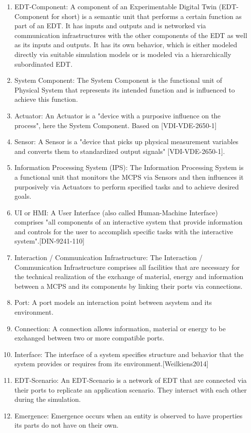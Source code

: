 \begin{enumerate}
\item EDT-Component: A component of an Experimentable Digital Twin (EDT-Component for short) is a semantic unit that performs a certain function as part of an EDT. It has inputs and outputs and is networked via communication infrastructures with the other components of the EDT as well as its inputs and outputs. It has its own behavior, which is either modeled directly via suitable simulation models or is modeled via a hierarchically subordinated EDT.

\item System Component: The System Component is the functional unit of Physical System that represents its intended function and is influenced to achieve this function.

\item Actuator: An Actuator is a "device with a purposive influence on the process", here the System Component. Based on [VDI-VDE-2650-1]

\item Sensor: A Sensor is a "device that picks up physical measurement variables and converts them to standardized output signals" [VDI-VDE-2650-1].

\item Information Processing System (IPS): The Information Processing System is a functional unit that monitors the MCPS via Sensors and then influences it purposively via Actuators to perform specified tasks and to achieve desired goals.

\item UI or HMI: A User Interface (also called Human-Machine Interface) comprises "all components of an interactive system that provide information and controls for the user to accomplish specific tasks with the interactive system".[DIN-9241-110]

\item Interaction / Communication Infrastructure: The Interaction / Communication Infrastructure comprises all facilities that are necessary for the technical realization of the exchange of material, energy and information between a MCPS and its components by linking their ports via connections.

\item Port: A port models an interaction point between asystem and its environment.

\item Connection: A connection allows information, material or energy to be exchanged between two or more compatible ports.

\item Interface: The interface of a system specifies structure and behavior that the system provides or requires from its environment.[Weilkiens2014]

\item EDT-Scenario: An EDT-Scenario is a network of EDT that are connected via their ports to replicate an application scenario. They interact with each other during the simulation.

\item Emergence: Emergence occurs when an entity is observed to have properties its parts do not have on their own.

\end{enumerate}